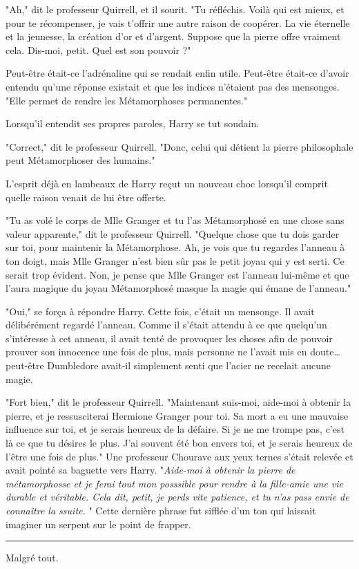 "Ah," dit le professeur Quirrell, et il sourit. "Tu réfléchis. Voilà qui est mieux, et pour te récompenser, je vais t'offrir une autre raison de coopérer. La vie éternelle et la jeunesse, la création d'or et d'argent. Suppose que la pierre offre vraiment cela. Dis-moi, petit. Quel est son pouvoir ?"

Peut-être était-ce l'adrénaline qui se rendait enfin utile. Peut-être était-ce d'avoir entendu qu'une réponse existait et que les indices n'étaient pas des mensonges. "Elle permet de rendre les Métamorphoses permanentes."

Lorsqu'il entendit ses propres paroles, Harry se tut soudain.

"Correct," dit le professeur Quirrell. "Donc, celui qui détient la pierre philosophale peut Métamorphoser des humains."

L'esprit déjà en lambeaux de Harry reçut un nouveau choc lorsqu'il comprit quelle raison venait de lui être offerte.

"Tu as volé le corps de Mlle Granger et tu l'as Métamorphosé en une chose sans valeur apparente," dit le professeur Quirrell. "Quelque chose que tu dois garder sur toi, pour maintenir la Métamorphose. Ah, je vois que tu regardes l'anneau à ton doigt, mais Mlle Granger n'est bien sûr pas le petit joyau qui y est serti. Ce serait trop évident. Non, je pense que Mlle Granger est l'anneau lui-même et que l'aura magique du joyau Métamorphosé masque la magie qui émane de l'anneau."

"Oui," se força à répondre Harry. Cette fois, c'était un mensonge. Il avait délibérément regardé l'anneau. Comme il s'était attendu à ce que quelqu'un s'intéresse à cet anneau, il avait tenté de provoquer les choses afin de pouvoir prouver son innocence une fois de plus, mais personne ne l'avait mis en doute… peut-être Dumbledore avait-il simplement senti que l'acier ne recelait aucune magie.

"Fort bien," dit le professeur Quirrell. "Maintenant suis-moi, aide-moi à obtenir la pierre, et je ressusciterai Hermione Granger pour toi. Sa mort a eu une mauvaise influence sur toi, et je serais heureux de la défaire. Si je ne me trompe pas, c'est là ce que tu désires le plus. J'ai souvent été bon envers toi, et je serais heureux de l'être une fois de plus." Une professeur Chourave aux yeux ternes s'était relevée et avait pointé sa baguette vers Harry. "\emph{Aide-moi à obtenir la pierre de métamorphosse et je ferai tout mon posssible pour rendre à la fille-amie une vie durable et véritable. Cela dit, petit, je perds vite patience, et tu n'as pass envie de connaître la ssuite.} " Cette dernière phrase fut sifflée d'un ton qui laissait imaginer un serpent sur le point de frapper.
\par\noindent\rule{\textwidth}{0.4pt}
Malgré tout.

